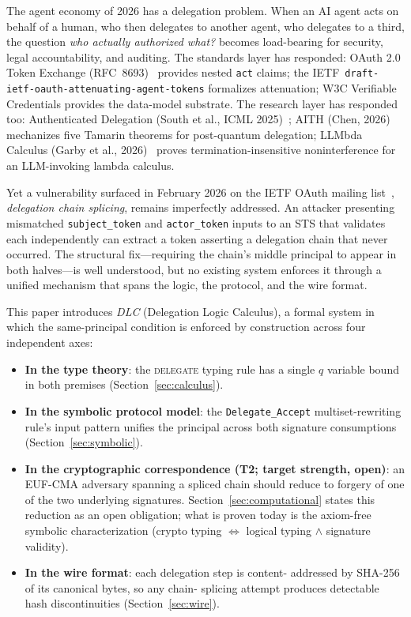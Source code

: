 
The agent economy of 2026 has a delegation problem.  When an AI agent
acts on behalf of a human, who then delegates to another agent, who
delegates to a third, the question \emph{who actually authorized
what?} becomes load-bearing for security, legal accountability, and
auditing.  The standards layer has responded: OAuth 2.0 Token
Exchange (RFC~8693)~\cite{rfc8693} provides nested \texttt{act}
claims; the IETF~\texttt{draft-ietf-oauth-attenuating-agent-tokens}
formalizes attenuation; W3C Verifiable Credentials provides the
data-model substrate.  The research layer has responded too:
Authenticated Delegation (South et al., ICML
2025)~\cite{south2025authdelegation}; AITH (Chen,
2026)~\cite{chen2026aith} mechanizes five Tamarin theorems for
post-quantum delegation; LLMbda Calculus (Garby et al.,
2026)~\cite{garby2026llmbda} proves termination-insensitive
noninterference for an LLM-invoking lambda calculus.

Yet a vulnerability surfaced in February 2026 on the IETF OAuth mailing
list~\cite{ietf2026splicing}, \emph{delegation chain splicing}, remains
imperfectly addressed.  An attacker presenting mismatched
\texttt{subject\_token} and \texttt{actor\_token} inputs to an STS
that validates each independently can extract a token asserting a
delegation chain that never occurred.  The structural fix---requiring
the chain's middle principal to appear in both halves---is well
understood, but no existing system enforces it through a unified
mechanism that spans the logic, the protocol, and the wire format.

This paper introduces \emph{DLC} (Delegation Logic Calculus), a
formal system in which the same-principal condition is enforced by
construction across four independent axes:

\begin{itemize}
\item \textbf{In the type theory}: the \textsc{delegate} typing rule
  has a single $q$ variable bound in both premises (Section~\ref{sec:calculus}).
\item \textbf{In the symbolic protocol model}: the
  \texttt{Delegate\_Accept} multiset-rewriting rule's input pattern
  unifies the principal across both signature consumptions
  (Section~\ref{sec:symbolic}).
\item \textbf{In the cryptographic correspondence (T2; target
  strength, open)}: an EUF-CMA adversary spanning a spliced chain
  should reduce to forgery of one of the two underlying signatures.
  Section~\ref{sec:computational} states this reduction as an open
  obligation; what is proven today is the axiom-free symbolic
  characterization (crypto typing $\iff$ logical typing $\wedge$
  signature validity).
\item \textbf{In the wire format}: each delegation step is content-
  addressed by SHA-256 of its canonical bytes, so any chain-
  splicing attempt produces detectable hash discontinuities
  (Section~\ref{sec:wire}).
\end{itemize}


